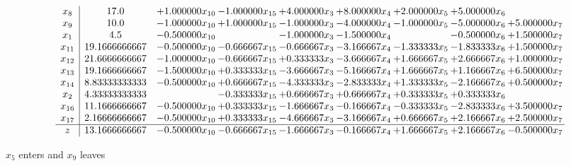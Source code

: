 \documentclass[10pt]{article}
\begin{document}
 \[\begin{array}{c| c c@{\hskip 2pt} c@{\hskip 2pt} c@{\hskip 2pt} c@{\hskip 2pt} c@{\hskip 2pt} c@{\hskip 2pt} c@{\hskip 2pt} }
 x_{8}   &  17.0 & + 1.000000 x_{10} & -1.000000 x_{15} & + 4.000000 x_{3} & + 8.000000 x_{4} & + 2.000000 x_{5} & + 5.000000 x_{6} &   \\
 x_{9}   &  10.0 & -1.000000 x_{10} & + 1.000000 x_{15} & -1.000000 x_{3} & -4.000000 x_{4} & -1.000000 x_{5} & -5.000000 x_{6} & + 5.000000 x_{7}\\
 x_{1}   &  4.5 & -0.500000 x_{10} &   & -1.000000 x_{3} & -1.500000 x_{4} &   & -0.500000 x_{6} & + 1.500000 x_{7}\\
 x_{11}   &  19.1666666667 & -0.500000 x_{10} & -0.666667 x_{15} & -0.666667 x_{3} & -3.166667 x_{4} & -1.333333 x_{5} & -1.833333 x_{6} & + 1.500000 x_{7}\\
 x_{12}   &  21.6666666667 & -1.000000 x_{10} & -0.666667 x_{15} & + 0.333333 x_{3} & -3.666667 x_{4} & + 1.666667 x_{5} & + 2.666667 x_{6} & + 1.000000 x_{7}\\
 x_{13}   &  19.1666666667 & -1.500000 x_{10} & + 0.333333 x_{15} & -3.666667 x_{3} & -5.166667 x_{4} & + 1.666667 x_{5} & + 1.166667 x_{6} & + 6.500000 x_{7}\\
 x_{14}   &  8.83333333333 & -0.500000 x_{10} & + 0.666667 x_{15} & -4.333333 x_{3} & -2.833333 x_{4} & + 1.333333 x_{5} & -2.166667 x_{6} & + 0.500000 x_{7}\\
 x_{2}   &  4.33333333333  &   & -0.333333 x_{15} & + 0.666667 x_{3} & + 0.666667 x_{4} & + 0.333333 x_{5} & + 0.333333 x_{6} &   \\
 x_{16}   &  11.1666666667 & -0.500000 x_{10} & + 0.333333 x_{15} & -1.666667 x_{3} & -0.166667 x_{4} & -0.333333 x_{5} & -2.833333 x_{6} & + 3.500000 x_{7}\\
 x_{17}   &  2.16666666667 & -0.500000 x_{10} & + 0.333333 x_{15} & -4.666667 x_{3} & -3.166667 x_{4} & + 0.666667 x_{5} & + 2.166667 x_{6} & + 2.500000 x_{7}\\
\hline
z    &  13.1666666667 & -0.500000 x_{10} & -0.666667 x_{15} & -1.666667 x_{3} & -0.166667 x_{4} & + 1.666667 x_{5} & + 2.166667 x_{6} & -0.500000 x_{7}\\
\end{array}\]


 $ x_{5} $ enters and $ x_{9} $ leaves 
\end{document}
